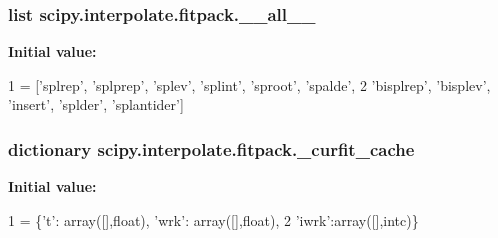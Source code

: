 \subsubsection[{\+\_\+\+\_\+all\+\_\+\+\_\+}]{\setlength{\rightskip}{0pt plus 5cm}list scipy.\+interpolate.\+fitpack.\+\_\+\+\_\+all\+\_\+\+\_\+}\label{namespacescipy_1_1interpolate_1_1fitpack_a65eee9893ce579b310317b8f067ced11}
{\bfseries Initial value\+:}
\begin{DoxyCode}
1 = [\textcolor{stringliteral}{'splrep'}, \textcolor{stringliteral}{'splprep'}, \textcolor{stringliteral}{'splev'}, \textcolor{stringliteral}{'splint'}, \textcolor{stringliteral}{'sproot'}, \textcolor{stringliteral}{'spalde'},
2     \textcolor{stringliteral}{'bisplrep'}, \textcolor{stringliteral}{'bisplev'}, \textcolor{stringliteral}{'insert'}, \textcolor{stringliteral}{'splder'}, \textcolor{stringliteral}{'splantider'}]
\end{DoxyCode}
\hypertarget{namespacescipy_1_1interpolate_1_1fitpack_a069ddb97291502837e31c6360a10a8e8}{}
\subsubsection[{\+\_\+curfit\+\_\+cache}]{\setlength{\rightskip}{0pt plus 5cm}dictionary scipy.\+interpolate.\+fitpack.\+\_\+curfit\+\_\+cache}\label{namespacescipy_1_1interpolate_1_1fitpack_a069ddb97291502837e31c6360a10a8e8}
{\bfseries Initial value\+:}
\begin{DoxyCode}
1 = \{\textcolor{stringliteral}{'t'}: array([],float), \textcolor{stringliteral}{'wrk'}: array([],float),
2                  \textcolor{stringliteral}{'iwrk'}:array([],intc)\}
\end{DoxyCode}
\hypertarget{namespacescipy_1_1interpolate_1_1fitpack_ab6715f34ca1201bfec232435cb6095d6}{}
